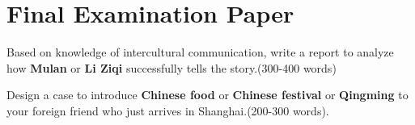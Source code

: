 \section{Final Examination Paper}

\begin{problem}
    Based on knowledge of intercultural communication, write a report to analyze how \textbf{Mulan} or \textbf{Li Ziqi}  successfully tells the story.(300-400 words)
\end{problem}

\begin{problem}
    Design a case to introduce \textbf{Chinese food} or \textbf{Chinese festival} or \textbf{Qingming} to your foreign friend who just arrives in Shanghai.(200-300 words).
\end{problem}

